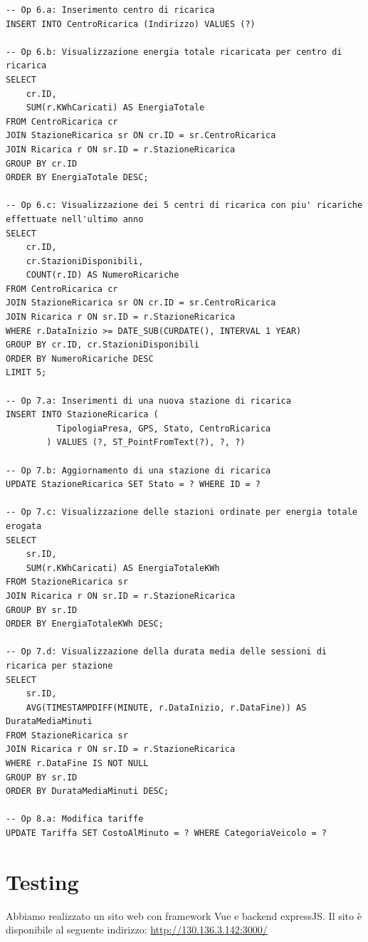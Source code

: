 \documentclass{article}
\begin{document}
\begin{lstlisting}
-- Op 6.a: Inserimento centro di ricarica
INSERT INTO CentroRicarica (Indirizzo) VALUES (?)

-- Op 6.b: Visualizzazione energia totale ricaricata per centro di ricarica
SELECT 
    cr.ID,
    SUM(r.KWhCaricati) AS EnergiaTotale
FROM CentroRicarica cr
JOIN StazioneRicarica sr ON cr.ID = sr.CentroRicarica
JOIN Ricarica r ON sr.ID = r.StazioneRicarica
GROUP BY cr.ID
ORDER BY EnergiaTotale DESC;

-- Op 6.c: Visualizzazione dei 5 centri di ricarica con piu' ricariche effettuate nell'ultimo anno
SELECT 
    cr.ID,
    cr.StazioniDisponibili,
    COUNT(r.ID) AS NumeroRicariche
FROM CentroRicarica cr
JOIN StazioneRicarica sr ON cr.ID = sr.CentroRicarica
JOIN Ricarica r ON sr.ID = r.StazioneRicarica
WHERE r.DataInizio >= DATE_SUB(CURDATE(), INTERVAL 1 YEAR)
GROUP BY cr.ID, cr.StazioniDisponibili
ORDER BY NumeroRicariche DESC
LIMIT 5;

-- Op 7.a: Inserimenti di una nuova stazione di ricarica
INSERT INTO StazioneRicarica (
          TipologiaPresa, GPS, Stato, CentroRicarica
        ) VALUES (?, ST_PointFromText(?), ?, ?)

-- Op 7.b: Aggiornamento di una stazione di ricarica
UPDATE StazioneRicarica SET Stato = ? WHERE ID = ?

-- Op 7.c: Visualizzazione delle stazioni ordinate per energia totale erogata
SELECT 
    sr.ID,
    SUM(r.KWhCaricati) AS EnergiaTotaleKWh
FROM StazioneRicarica sr
JOIN Ricarica r ON sr.ID = r.StazioneRicarica
GROUP BY sr.ID
ORDER BY EnergiaTotaleKWh DESC;

-- Op 7.d: Visualizzazione della durata media delle sessioni di ricarica per stazione
SELECT 
    sr.ID,
    AVG(TIMESTAMPDIFF(MINUTE, r.DataInizio, r.DataFine)) AS DurataMediaMinuti
FROM StazioneRicarica sr
JOIN Ricarica r ON sr.ID = r.StazioneRicarica
WHERE r.DataFine IS NOT NULL
GROUP BY sr.ID
ORDER BY DurataMediaMinuti DESC;

-- Op 8.a: Modifica tariffe
UPDATE Tariffa SET CostoAlMinuto = ? WHERE CategoriaVeicolo = ?
\end{lstlisting}

\section{Testing}

Abbiamo realizzato un sito web con framework Vue e backend expressJS. Il sito è disponibile al seguente indirizzo: \url{http://130.136.3.142:3000/}
\end{document}
